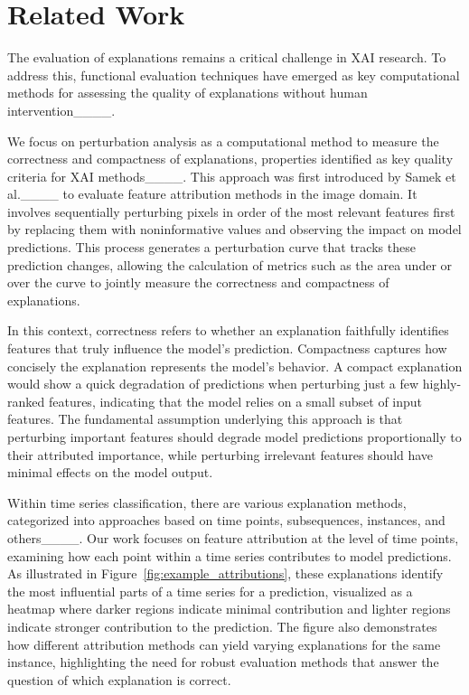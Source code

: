 \section{Related Work}
\label{h:related-work}

The evaluation of explanations remains a critical challenge in XAI research. To address this, functional evaluation techniques have emerged as key computational methods for assessing the quality of explanations without human intervention____. 

We focus on perturbation analysis as a computational method to measure the correctness and compactness of explanations, properties identified as key quality criteria for XAI methods____. This approach was first introduced by Samek et al.____ to evaluate feature attribution methods in the image domain. It involves sequentially perturbing pixels in order of the most relevant features first by replacing them with noninformative values and observing the impact on model predictions. This process generates a perturbation curve that tracks these prediction changes, allowing the calculation of metrics such as the area under or over the curve to jointly measure the correctness and compactness of explanations.

In this context, correctness refers to whether an explanation faithfully identifies features that truly influence the model's prediction. Compactness captures how concisely the explanation represents the model's behavior. A compact explanation would show a quick degradation of predictions when perturbing just a few highly-ranked features, indicating that the model relies on a small subset of input features. The fundamental assumption underlying this approach is that perturbing important features should degrade model predictions proportionally to their attributed importance, while perturbing irrelevant features should have minimal effects on the model output.

Within time series classification, there are various explanation methods, categorized into approaches based on time points, subsequences, instances, and others____. Our work focuses on feature attribution at the level of time points, examining how each point within a time series contributes to model predictions. As illustrated in Figure~\ref{fig:example_attributions}, these explanations identify the most influential parts of a time series for a prediction, visualized as a heatmap where darker regions indicate minimal contribution and lighter regions indicate stronger contribution to the prediction. The figure also demonstrates how different attribution methods can yield varying explanations for the same instance, highlighting the need for robust evaluation methods that answer the question of which explanation is correct.

